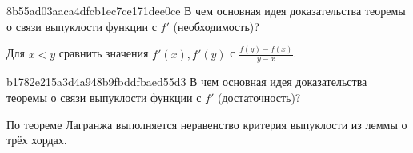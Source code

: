 
\begin{note}{8b55ad03aaca4dfcb1ec7ce171dee0ce}
    В чем основная идея доказательства теоремы о связи выпуклости функции с \({ f' }\) (необходимость)?

    \begin{cloze}{1}
        Для \({ x < y }\) сравнить значения \({ f'(x), f'(y) }\) с \({ \frac{f(y) - f(x)}{y - x} }\).
    \end{cloze}
\end{note}

\begin{note}{b1782e215a3d4a948b9fbddfbaed55d3}
    В чем основная идея доказательства теоремы о связи выпуклости функции с \({ f' }\) (достаточность)?

    \begin{cloze}{1}
        По теореме Лагранжа выполняется неравенство критерия выпуклости из леммы о трёх хордах.
    \end{cloze}
\end{note}

